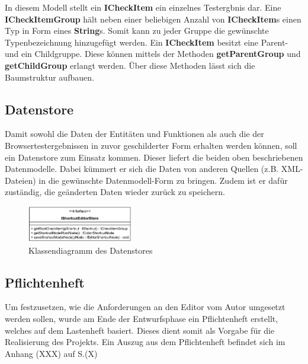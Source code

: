 In diesem Modell stellt ein \textbf{ICheckItem} ein einzelnes Testergbnis dar. Eine \textbf{ICheckItemGroup} hält neben einer beliebigen Anzahl von \textbf{ICheckItem}s einen Typ in Form eines \textbf{String}s. Somit kann zu jeder Gruppe die gewünschte Typenbezeichnung hinzugefügt werden. Ein \textbf{ICheckItem} besitzt eine Parent- und ein Childgruppe. Diese können mittels der Methoden \textbf{getParentGroup} und \textbf{getChildGroup} erlangt werden. Über diese Methoden lässt sich die Baumstruktur aufbauen.

\vspace{-5px}

\subsection{Datenstore}

Damit sowohl die Daten der Entitäten und Funktionen als auch die der Browsertestergebnissen in zuvor geschilderter Form erhalten werden können, soll ein Datenstore zum Einsatz kommen. Dieser liefert die beiden oben beschriebenen Datenmodelle. Dabei kümmert er sich die Daten von anderen Quellen (z.B. XML-Dateien) in die gewünschte Datenmodell-Form zu bringen. Zudem ist er dafür zuständig, die geänderten Daten wieder zurück zu speichern.

\vspace{-2px}

\begin{figure}[H]
	\centering
	\includegraphics[height=60px]{../graphic/diagrams/CD_IShortcutEditorStore/IShortcutEditorStore}
	\caption{Klassendiagramm des Datenstores}
	\label{fig:ishortcuteditorstore}
\end{figure}

\vspace{-32px}

\subsection{Pflichtenheft}

Um festzusetzen, wie die Anforderungen an den Editor vom Autor umgesetzt werden sollen, wurde am Ende der Entwurfsphase ein Pflichtenheft erstellt, welches auf dem Lastenheft basiert. Dieses dient somit als Vorgabe für die Realisierung des Projekts. Ein Auszug aus dem Pflichtenheft befindet sich im Anhang (XXX) auf S.(X)



\newpage